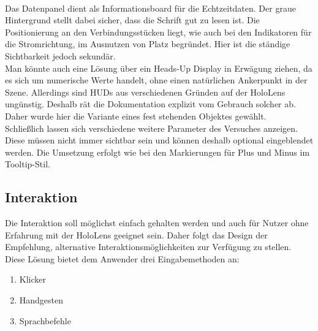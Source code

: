 \vspace{8px}
\begin{center}
	\\
\end{center}
\vspace{6px}

Das Datenpanel dient als Informationsboard für die Echtzeitdaten. Der graue Hintergrund stellt dabei sicher, dass die Schrift gut zu lesen ist. Die Positionierung an den Verbindungsstücken liegt, wie auch bei den Indikatoren für die Stromrichtung, im Ausnutzen von Platz begründet. Hier ist die ständige Sichtbarkeit jedoch sekundär.\\

Man könnte auch eine Lösung über ein Heads-Up Display in Erwägung ziehen, da es sich um numerische Werte handelt, ohne einen natürlichen Ankerpunkt in der Szene. Allerdings sind HUDs aus verschiedenen Gründen auf der HoloLens ungünstig. Deshalb rät die Dokumentation explizit vom Gebrauch solcher ab. Daher wurde hier die Variante eines fest stehenden Objektes gewählt.\\

Schließlich lassen sich verschiedene weitere Parameter des Versuches anzeigen. Diese müssen nicht immer sichtbar sein und können deshalb optional eingeblendet werden. Die Umsetzung erfolgt wie bei den Markierungen für Plus und Minus im Tooltip-Stil.\\
\subsection{Interaktion}
\label{sec-4-4}
Die Interaktion soll möglichst einfach gehalten werden und auch für Nutzer ohne Erfahrung mit der HoloLens geeignet sein. Daher folgt das Design der Empfehlung, alternative Interaktionsmöglichkeiten zur Verfügung zu stellen. Diese Lösung bietet dem Anwender drei Eingabemethoden an:
\begin{enumerate}
	\setlength{\itemsep}{-5pt}
	\item Klicker
	\item Handgesten
	\item Sprachbefehle
\end{enumerate}

